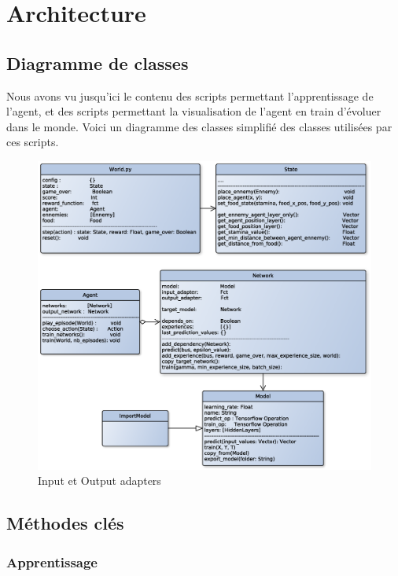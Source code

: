 \documentclass[11pt,a4paper]{report}
\begin{document}
  \section{Architecture}
  
  \subsection{Diagramme de classes}
  
  \par Nous avons vu jusqu'ici le contenu des scripts permettant l'apprentissage de l'agent, et des scripts permettant la visualisation de l'agent en train d'évoluer dans le monde. Voici un diagramme des classes simplifié des classes utilisées par ces scripts. 
  
  \begin{figure}[!h]
  \center
  \includegraphics[scale=0.6]{ressources/class_diagram.eps}
  \caption{Input et Output adapters}
  \end{figure} 
  
  \subsection{Méthodes clés}
  
  \subsubsection{Apprentissage}
  
\end{document}
